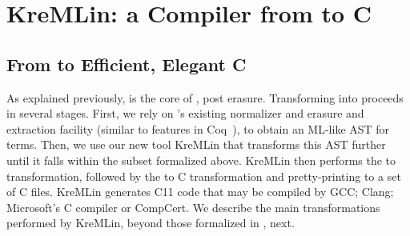 \documentclass[acmsmall,review,anonymous]{acmart}\settopmatter{printfolios=true}
\begin{document}




\maketitle


\ifpagelimits
\newpage
\fi

\ifpagelimits
\newpage
\fi

\ifpagelimits
\newpage
\fi

\section{KreMLin: a Compiler from \lowstar to C}
\label{sec:impl}

\subsection{From \lowstar to Efficient, Elegant C}

As explained previously, \lamstar is the core of \lowstar, post
erasure. Transforming \lowstar into \lamstar proceeds in several
stages. First, we rely on \fstar's existing normalizer and erasure and
extraction facility (similar to features in Coq~\citep{Letouzey08}),
to obtain an ML-like AST for \lowstar terms. Then, we use our new tool
KreMLin that transforms this AST further until it falls within the
\lamstar subset formalized above. KreMLin then performs the \lamstar
to \cstar transformation, followed by the \cstar to C transformation
and pretty-printing to a set of C files. KreMLin generates C11 code
that may be compiled by GCC; Clang; Microsoft's C compiler or
CompCert. We describe the main transformations performed by KreMLin,
beyond those formalized in , next.
\end{document}

